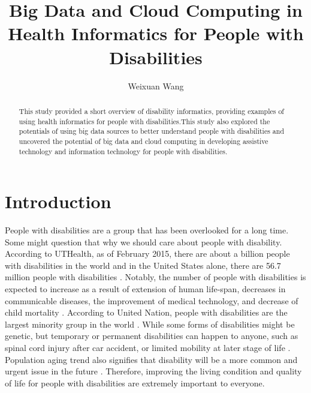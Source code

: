 \documentclass[sigconf]{acmart}
\begin{document}
\title{Big Data and Cloud Computing in Health Informatics for People with Disabilities}


\author{Weixuan Wang}


\renewcommand{\shortauthors}{W. Wang}


\begin{abstract}
This study provided a short overview of disability informatics, providing examples of using health informatics
for people with disabilities.This study also explored the potentials of using big data sources to better understand 
people with disabilities and uncovered the potential of big data and cloud computing in developing assistive 
technology and information technology for people with disabilities. 
\end{abstract}



\maketitle



\section{Introduction}
People with disabilities are a group that has been overlooked for a long time. Some might question that why
we should care about people with disability. According to UTHealth, as of February 2015, there are about a 
billion people with disabilities in the world and in the United States alone, there are 56.7 million people
with disabilities \cite{Lex}. Notably, the number of people with disabilities is expected to increase as a 
result of extension of human life-span, decreases in communicable diseases, the improvement of medical
technology, and decrease of child mortality \cite{SMITH1987376}. According to United Nation, people with 
disabilities are the largest minority group in the world \cite{Appleyard2005,DARCY2010816,Lex}. While some 
forms of disabilities might be genetic, but temporary or permanent disabilities can happen to anyone, such 
as spinal cord injury after car accident, or limited mobility at later stage of life \cite{Lex}. Population
aging trend also signifies that disability will be a more common and urgent issue in the future \cite{Grue}. 
Therefore, improving the living condition and quality of life for people with disabilities are extremely
important to everyone.
\end{document}
